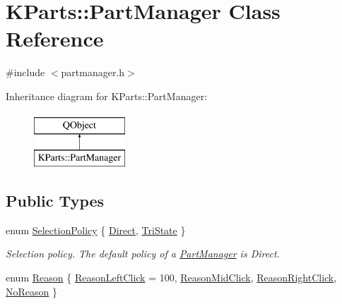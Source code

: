 \hypertarget{classKParts_1_1PartManager}{\section{K\+Parts\+:\+:Part\+Manager Class Reference}
\label{classKParts_1_1PartManager}
}


{\ttfamily \#include $<$partmanager.\+h$>$}

Inheritance diagram for K\+Parts\+:\+:Part\+Manager\+:\begin{figure}[H]
\begin{center}
\leavevmode
\includegraphics[height=2.000000cm]{classKParts_1_1PartManager}
\end{center}
\end{figure}
\subsection*{Public Types}
\begin{DoxyCompactItemize}
\item 
enum \hyperlink{classKParts_1_1PartManager_a7db25fb7e7f91548fa15566b3af4bb34}{Selection\+Policy} \{ \hyperlink{classKParts_1_1PartManager_a7db25fb7e7f91548fa15566b3af4bb34a79efb88f687be8f2b3aac8df408f837e}{Direct}, 
\hyperlink{classKParts_1_1PartManager_a7db25fb7e7f91548fa15566b3af4bb34aa481c1128a4e5df7d28446725af88482}{Tri\+State}
 \}
\begin{DoxyCompactList}\small\item\em Selection policy. The default policy of a \hyperlink{classKParts_1_1PartManager}{Part\+Manager} is Direct. \end{DoxyCompactList}\item 
enum \hyperlink{classKParts_1_1PartManager_a2210acbbe8638df29b112c48e4d9cfb3}{Reason} \{ \hyperlink{classKParts_1_1PartManager_a2210acbbe8638df29b112c48e4d9cfb3a6674110c2c4c77f14b4b1f3f05007930}{Reason\+Left\+Click} = 100, 
\hyperlink{classKParts_1_1PartManager_a2210acbbe8638df29b112c48e4d9cfb3a994f0fd06068a24c988a111ce920c58a}{Reason\+Mid\+Click}, 
\hyperlink{classKParts_1_1PartManager_a2210acbbe8638df29b112c48e4d9cfb3a3033a1660a6aaf18dbf6c945d9b0bbaf}{Reason\+Right\+Click}, 
\hyperlink{classKParts_1_1PartManager_a2210acbbe8638df29b112c48e4d9cfb3ae3a0e71725462dd7c5f6b63d26bddfe9}{No\+Reason}
 \}
\end{DoxyCompactItemize}
